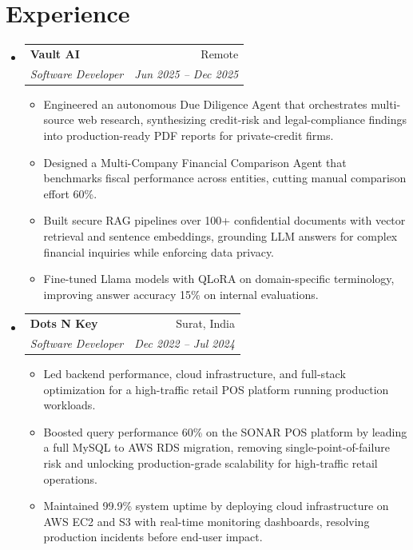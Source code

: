 \documentclass[letterpaper,11pt]{article}
\makeatletter
\newcommand{\resumeItem}[1]{
  \item\small{
    {#1 \vspace{-2pt}}
  }
}
\newcommand{\resumeSubheading}[4]{
  \vspace{-2pt}\item
    \begin{tabular*}{0.97\textwidth}[t]{l@{\extracolsep{\fill}}r}
      \textbf{#1} & #2 \\
      \textit{\small#3} & \textit{\small #4} \\
    \end{tabular*}\vspace{-7pt}
}
\newcommand{\resumeSubHeadingListStart}{\begin{itemize}[leftmargin=0.15in, label={}]}
\newcommand{\resumeSubHeadingListEnd}{\end{itemize}}
\newcommand{\resumeItemListStart}{\begin{itemize}}
\newcommand{\resumeItemListEnd}{\end{itemize}\vspace{-5pt}}
\makeatother
\begin{document}
\section{Experience}
  \resumeSubHeadingListStart
    \resumeSubheading
      {Vault AI}{Remote}
      {Software Developer}{Jun 2025 -- Dec 2025}
      \resumeItemListStart
        \resumeItem{Engineered an autonomous Due Diligence Agent that orchestrates multi-source web research, synthesizing credit-risk and legal-compliance findings into production-ready PDF reports for private-credit firms.}
        \resumeItem{Designed a Multi-Company Financial Comparison Agent that benchmarks fiscal performance across entities, cutting manual comparison effort 60\%.}
        \resumeItem{Built secure RAG pipelines over 100+ confidential documents with vector retrieval and sentence embeddings, grounding LLM answers for complex financial inquiries while enforcing data privacy.}
        \resumeItem{Fine-tuned Llama models with QLoRA on domain-specific terminology, improving answer accuracy 15\% on internal evaluations.}
      \resumeItemListEnd
    \resumeSubheading
      {Dots N Key}{Surat, India}
      {Software Developer}{Dec 2022 -- Jul 2024}
      \resumeItemListStart
        \resumeItem{Led backend performance, cloud infrastructure, and full-stack optimization for a high-traffic retail POS platform running production workloads.}
        \resumeItem{Boosted query performance 60\% on the SONAR POS platform by leading a full MySQL to AWS RDS migration, removing single-point-of-failure risk and unlocking production-grade scalability for high-traffic retail operations.}
        \resumeItem{Maintained 99.9\% system uptime by deploying cloud infrastructure on AWS EC2 and S3 with real-time monitoring dashboards, resolving production incidents before end-user impact.}
      \resumeItemListEnd
  \resumeSubHeadingListEnd

\end{document}
